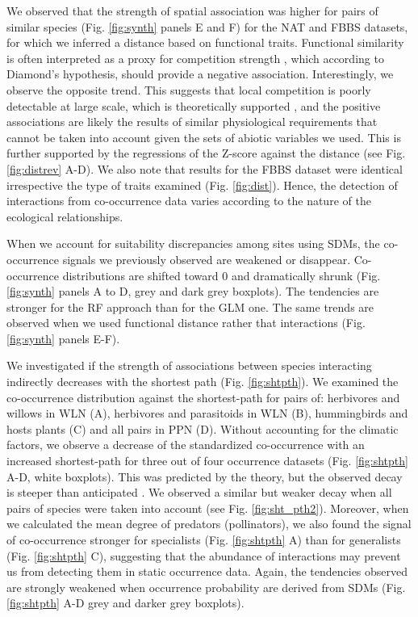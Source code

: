 We observed that the strength of spatial association was higher for
pairs of similar species (Fig. \ref{fig:synth} panels E and F) for the
NAT and FBBS datasets, for which we inferred a distance based on
functional traits. Functional similarity is often interpreted as a proxy
for competition strength \citep{Morales-Castilla2015}, which according
to Diamond's hypothesis, should provide a negative association.
Interestingly, we observe the opposite trend. This suggests that local
competition is poorly detectable at large scale, which is theoretically
supported \citep{Araujo2014}, and the positive associations are likely
the results of similar physiological requirements that cannot be taken
into account given the sets of abiotic variables we used. This is
further supported by the regressions of the Z-score against the distance
(see Fig. \ref{fig:distrev} A-D). We also note that results for the FBBS
dataset were identical irrespective the type of traits examined (Fig.
\ref{fig:dist}). Hence, the detection of interactions from co-occurrence
data varies according to the nature of the ecological relationships.

When we account for suitability discrepancies among sites using SDMs,
the co-occurrence signals we previously observed are weakened or
disappear. Co-occurrence distributions are shifted toward 0 and
dramatically shrunk (Fig. \ref{fig:synth} panels A to D, grey and dark
grey boxplots). The tendencies are stronger for the RF approach than for
the GLM one. The same trends are observed when we used functional
distance rather that interactions (Fig. \ref{fig:synth} panels E-F).

We investigated if the strength of associations between species
interacting indirectly decreases with the shortest path (Fig.
\ref{fig:shtpth}). We examined the co-occurrence distribution against
the shortest-path for pairs of: herbivores and willows in WLN (A),
herbivores and parasitoids in WLN (B), hummingbirds and hosts plants (C)
and all pairs in PPN (D). Without accounting for the climatic factors,
we observe a decrease of the standardized co-occurrence with an
increased shortest-path for three out of four occurrence datasets (Fig.
\ref{fig:shtpth} A-D, white boxplots). This was predicted by the theory,
but the observed decay is steeper than anticipated \citep{Cazelles2016}.
We observed a similar but weaker decay when all pairs of species were
taken into account (see Fig. \ref{fig:sht_pth2}). Moreover, when we
calculated the mean degree of predators (pollinators), we also found the
signal of co-occurrence stronger for specialists (Fig. \ref{fig:shtpth}
A) than for generalists (Fig. \ref{fig:shtpth} C), suggesting that the
abundance of interactions may prevent us from detecting them in static
occurrence data. Again, the tendencies observed are strongly weakened
when occurrence probability are derived from SDMs (Fig. \ref{fig:shtpth}
A-D grey and darker grey boxplots).

